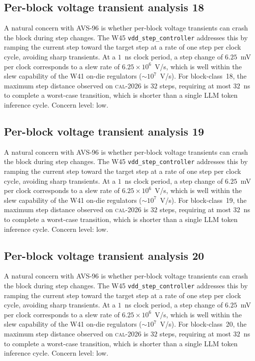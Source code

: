 \subsection{Per-block voltage transient analysis 18}

A natural concern with AVS-96 is whether per-block voltage transients
can crash the block during step changes. The W45 \texttt{vdd\_step\_controller} addresses this by ramping the current
step toward the target step at a rate of one step per clock cycle,
avoiding sharp transients. At a $1$~ns clock period, a step change of
$6.25$~mV per clock corresponds to a slew rate of $6.25\times 10^6$~V/s,
which is well within the slew capability of the W41 on-die regulators
($\sim 10^7$~V/s). For block-class~18, the maximum step distance
observed on \textsc{cal-2026} is $32$ steps, requiring at most $32$~ns
to complete a worst-case transition, which is shorter than a single
LLM token inference cycle. Concern level: low.


\subsection{Per-block voltage transient analysis 19}

A natural concern with AVS-96 is whether per-block voltage transients
can crash the block during step changes. The W45 \texttt{vdd\_step\_controller} addresses this by ramping the current
step toward the target step at a rate of one step per clock cycle,
avoiding sharp transients. At a $1$~ns clock period, a step change of
$6.25$~mV per clock corresponds to a slew rate of $6.25\times 10^6$~V/s,
which is well within the slew capability of the W41 on-die regulators
($\sim 10^7$~V/s). For block-class~19, the maximum step distance
observed on \textsc{cal-2026} is $32$ steps, requiring at most $32$~ns
to complete a worst-case transition, which is shorter than a single
LLM token inference cycle. Concern level: low.


\subsection{Per-block voltage transient analysis 20}

A natural concern with AVS-96 is whether per-block voltage transients
can crash the block during step changes. The W45 \texttt{vdd\_step\_controller} addresses this by ramping the current
step toward the target step at a rate of one step per clock cycle,
avoiding sharp transients. At a $1$~ns clock period, a step change of
$6.25$~mV per clock corresponds to a slew rate of $6.25\times 10^6$~V/s,
which is well within the slew capability of the W41 on-die regulators
($\sim 10^7$~V/s). For block-class~20, the maximum step distance
observed on \textsc{cal-2026} is $32$ steps, requiring at most $32$~ns
to complete a worst-case transition, which is shorter than a single
LLM token inference cycle. Concern level: low.



